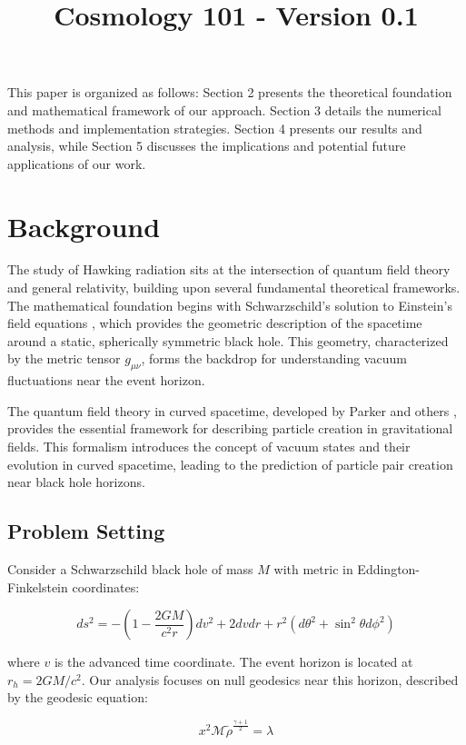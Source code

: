 \documentclass{article}\usepackage{graphicx} \usepackage{amsmath} \usepackage{colortbl}\title{Cosmology 101 - Version 0.1}
\begin{document}
This paper is organized as follows: Section 2 presents the theoretical foundation and mathematical framework of our approach. Section 3 details the numerical methods and implementation strategies. Section 4 presents our results and analysis, while Section 5 discusses the implications and potential future applications of our work.\section{Background}

The study of Hawking radiation sits at the intersection of quantum field theory and general relativity, building upon several fundamental theoretical frameworks. The mathematical foundation begins with Schwarzschild's solution to Einstein's field equations \cite{hawking1975}, which provides the geometric description of the spacetime around a static, spherically symmetric black hole. This geometry, characterized by the metric tensor $g_{\mu\nu}$, forms the backdrop for understanding vacuum fluctuations near the event horizon.

The quantum field theory in curved spacetime, developed by Parker and others \cite{birrell1984}, provides the essential framework for describing particle creation in gravitational fields. This formalism introduces the concept of vacuum states and their evolution in curved spacetime, leading to the prediction of particle pair creation near black hole horizons.

\subsection{Problem Setting}
Consider a Schwarzschild black hole of mass $M$ with metric in Eddington-Finkelstein coordinates:

\begin{equation}
ds^2 = -\left(1-\frac{2GM}{c^2r}\right)dv^2 + 2dvdr + r^2(d\theta^2 + \sin^2\theta d\phi^2)
\end{equation}

where $v$ is the advanced time coordinate. The event horizon is located at $r_h = 2GM/c^2$. Our analysis focuses on null geodesics near this horizon, described by the geodesic equation:

 \begin{equation}x^2 \mathcal{M} \tilde{\rho }^{\frac{\gamma +1}{2}}=\lambda \label{Mi ecuacion 8} \end{equation}
\end{document}
